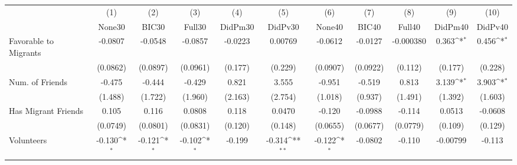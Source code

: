 {
\def\sym#1{\ifmmode^{#1}\else\(^{#1}\)\fi}
\begin{tabular}{l*{10}{c}}
\toprule
            &\multicolumn{1}{c}{(1)}&\multicolumn{1}{c}{(2)}&\multicolumn{1}{c}{(3)}&\multicolumn{1}{c}{(4)}&\multicolumn{1}{c}{(5)}&\multicolumn{1}{c}{(6)}&\multicolumn{1}{c}{(7)}&\multicolumn{1}{c}{(8)}&\multicolumn{1}{c}{(9)}&\multicolumn{1}{c}{(10)}\\
            &\multicolumn{1}{c}{None30}&\multicolumn{1}{c}{BIC30}&\multicolumn{1}{c}{Full30}&\multicolumn{1}{c}{DidPm30}&\multicolumn{1}{c}{DidPv30}&\multicolumn{1}{c}{None40}&\multicolumn{1}{c}{BIC40}&\multicolumn{1}{c}{Full40}&\multicolumn{1}{c}{DidPm40}&\multicolumn{1}{c}{DidPv40}\\
\midrule
Favorable to Migrants&     -0.0807         &     -0.0548         &     -0.0857         &     -0.0223         &     0.00769         &     -0.0612         &     -0.0127         &   -0.000380         &       0.363\sym{*}  &       0.456\sym{*}  \\
            &    (0.0862)         &    (0.0897)         &    (0.0961)         &     (0.177)         &     (0.229)         &    (0.0907)         &    (0.0922)         &     (0.112)         &     (0.177)         &     (0.228)         \\
\addlinespace
Num. of Friends&      -0.475         &      -0.444         &      -0.429         &       0.821         &       3.555         &      -0.951         &      -0.519         &       0.813         &       3.139\sym{*}  &       3.903\sym{*}  \\
            &     (1.488)         &     (1.722)         &     (1.960)         &     (2.163)         &     (2.754)         &     (1.018)         &     (0.937)         &     (1.491)         &     (1.392)         &     (1.603)         \\
\addlinespace
Has Migrant Friends&       0.105         &       0.116         &      0.0808         &       0.118         &      0.0470         &      -0.120         &     -0.0988         &      -0.114         &      0.0513         &     -0.0608         \\
            &    (0.0749)         &    (0.0801)         &    (0.0831)         &     (0.120)         &     (0.148)         &    (0.0655)         &    (0.0677)         &    (0.0779)         &     (0.109)         &     (0.129)         \\
\addlinespace
Volunteers  &      -0.130\sym{*}  &      -0.121\sym{*}  &      -0.102\sym{*}  &      -0.199         &      -0.314\sym{**} &      -0.122\sym{*}  &     -0.0802         &      -0.110         &    -0.00799         &      -0.113         \\

\end{tabular}}
